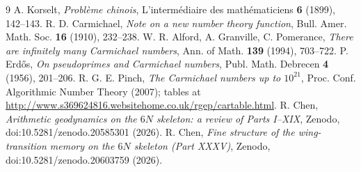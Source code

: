 \documentclass[11pt]{article}
\theoremstyle{plain}
\theoremstyle{definition}
\begin{document}
\begin{thebibliography}{9}
 A. Korselt, \emph{Probl\`eme chinois}, L'interm\'ediaire des math\'ematiciens \textbf{6} (1899), 142--143.
 R. D. Carmichael, \emph{Note on a new number theory function}, Bull. Amer. Math. Soc. \textbf{16} (1910), 232--238.
 W. R. Alford, A. Granville, C. Pomerance, \emph{There are infinitely many Carmichael numbers}, Ann. of Math. \textbf{139} (1994), 703--722.
 P. Erd\H{o}s, \emph{On pseudoprimes and Carmichael numbers}, Publ. Math. Debrecen \textbf{4} (1956), 201--206.
 R. G. E. Pinch, \emph{The Carmichael numbers up to $10^{21}$}, Proc. Conf. Algorithmic Number Theory (2007); tables at \url{http://www.s369624816.websitehome.co.uk/rgep/cartable.html}.
 R. Chen, \emph{Arithmetic geodynamics on the $6N$ skeleton: a review of Parts I--XIX}, Zenodo, doi:10.5281/zenodo.20585301 (2026).
 R. Chen, \emph{Fine structure of the wing-transition memory on the $6N$ skeleton (Part XXXV)}, Zenodo, doi:10.5281/zenodo.20603759 (2026).
\end{thebibliography}
\end{document}
